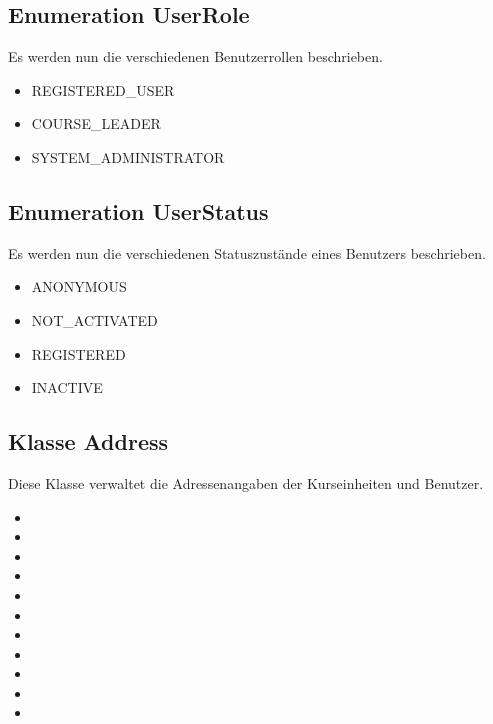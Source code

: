 	\subsection{Enumeration UserRole}
	Es werden nun die verschiedenen Benutzerrollen beschrieben.
	\begin{itemize}
		\item {REGISTERED\_USER}
		\item {COURSE\_LEADER}
		\item {SYSTEM\_ADMINISTRATOR}
	\end{itemize}
	
	\subsection{Enumeration UserStatus}
	Es werden nun die verschiedenen Statuszustände eines Benutzers beschrieben.
	\begin{itemize}
		\item {ANONYMOUS}
		\item {NOT\_ACTIVATED}
		\item {REGISTERED}
		\item {INACTIVE}
	\end{itemize}
	
	
	\subsection{Klasse Address}
	Diese Klasse verwaltet die Adressenangaben der Kurseinheiten und Benutzer.
	\begin{itemize}
		\item {}
		\item {}
		\item {}
		\item {}
		\item {}
		\item {}
		\item {}
		\item {}
		\item {}
		\item {}
		\item {}	
	\end{itemize}
	
